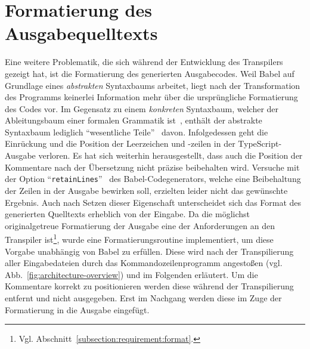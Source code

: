 \section{Formatierung des Ausgabequelltexts}
\label{sec:formatting}

Eine weitere Problematik, die sich während der Entwicklung des Transpilers gezeigt hat, ist die Formatierung des generierten Ausgabecodes. Weil Babel auf Grundlage eines \emph{abstrakten} Syntaxbaums arbeitet, liegt nach der Transformation des Programms keinerlei Information mehr über die ursprüngliche Formatierung des Codes vor. Im Gegensatz zu einem \emph{konkreten} Syntaxbaum, welcher der Ableitungsbaum einer formalen Grammatik ist~\autocite[45]{AHO:COMPILERS}, enthält der abstrakte Syntaxbaum lediglich \enquote{wesentliche Teile}~\autocite[21]{WALDMANN:PPS} davon. Infolgedessen geht die Einrückung und die Position der Leerzeichen und -zeilen in der TypeScript-Ausgabe verloren. Es hat sich weiterhin herausgestellt, dass auch die Position der Kommentare nach der Übersetzung nicht präzise beibehalten wird. Versuche mit der Option \enquote{\texttt{retainLines}}~\autocite{BABEL:GENERATOR} des Babel-Codegenerators, welche eine Beibehaltung der Zeilen in der Ausgabe bewirken soll, erzielten leider nicht das gewünschte Ergebnis. Auch nach Setzen dieser Eigenschaft unterscheidet sich das Format des generierten Quelltexts erheblich von der Eingabe. Da die möglichst originalgetreue Formatierung der Ausgabe eine der Anforderungen an den Transpiler ist\footnote{Vgl. Abschnitt~\ref{subsection:requirement:format}.}, wurde eine Formatierungsroutine implementiert, um diese Vorgabe unabhängig von Babel zu erfüllen. Diese wird nach der Transpilierung aller Eingabedateien durch das Kommandozeilenprogramm angestoßen (vgl. Abb.~\ref{fig:architecture-overview}) und im Folgenden erläutert. Um die Kommentare korrekt zu positionieren werden diese während der Transpilierung entfernt und nicht ausgegeben. Erst im Nachgang werden diese im Zuge der Formatierung in die Ausgabe eingefügt.

